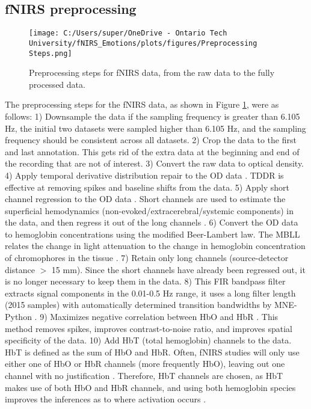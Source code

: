 \subsection{fNIRS preprocessing}
\label{sec:preprocessing}
\begin{figure}[H]
    \centering
    \texttt{[image: C:/Users/super/OneDrive - Ontario Tech University/fNIRS\_Emotions/plots/figures/Preprocessing Steps.png]}
    \caption[Preprocessing steps for fNIRS data]{Preprocessing steps for fNIRS data, from the raw data to the fully processed data. }
    \label{fig:preprocessing_steps}
\end{figure}

The preprocessing steps for the fNIRS data, as shown in Figure \ref{fig:preprocessing_steps}, were as follows:
1) Downsample the data if the sampling frequency is greater than 6.105 Hz, the initial two datasets were sampled higher than 6.105 Hz, and the sampling frequency should be consistent across all datasets.
2) Crop the data to the first and last annotation. This gets rid of the extra data at the beginning and end of the recording that are not of interest.
3) Convert the raw data to optical density.
4) Apply temporal derivative distribution repair to the OD data \citep{fishburn_temporal_2019}. TDDR is effective at removing spikes and baseline shifts from the data. 
5) Apply short channel regression to the OD data \citep{scholkmann_measuring_2014}. Short channels are used to estimate the superficial hemodynamics (non-evoked/extracerebral/systemic components) in the data, and then regress it out of the long channels \citep{tachtsidis_false_2016}. 
6) Convert the OD data to hemoglobin concentrations using the modified Beer-Lambert law. The MBLL relates the change in light attenuation to the change in hemoglobin concentration of chromophores in the tissue \citep{kocsis_modified_2006}.
7) Retain only long channels (source-detector distance $>$ 15 mm). Since the short channels have already been regressed out, it is no longer necessary to keep them in the data.
8) This FIR bandpass filter extracts signal components in the 0.01-0.5 Hz range, it uses a long filter length (2015 samples) with automatically determined transition bandwidths by MNE-Python \citep{pinti_current_2019}. 
9) Maximizes negative correlation between HbO and HbR \citep{cui_functional_2010}. This method removes spikes, improves contrast-to-noise ratio, and improves spatial specificity of the data.
10) Add HbT (total hemoglobin) channels to the data. HbT is defined as the sum of HbO and HbR. Often, fNIRS studies will only use either one of HbO or HbR channels (more frequently HbO), leaving out one channel with no justification \citep{kinder_systematic_2022}. Therefore, HbT channels are chosen, as HbT makes use of both HbO and HbR channels, and using both hemoglobin species improves the inferences as to where activation occurs \citep{hocke_automated_2018}.

